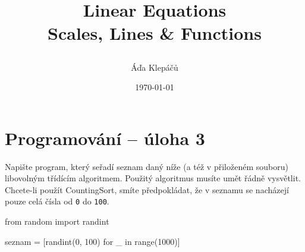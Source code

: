 \documentclass[a4paper,12pt]{article}
\title{\Huge\textsf{Linear Equations}\\
 \Large\textsf{Scales, Lines \& Functions}
 \author{Áďa Klepáčů}
 \date{\today}
}
\begin{document}
\thispagestyle{fancy}

\section*{Programování -- úloha 3}

Napište program, který seřadí seznam daný níže (a též v přiloženém souboru)
libovolným třídícím algoritmem. Použitý algoritmus musíte umět řádně vysvětlit.
Chcete-li použít CountingSort, smíte předpokládat, že v seznamu se nacházejí
pouze celá čísla od \texttt{0} do \texttt{100}.

\begin{center}
 \begin{python}
  from random import randint

  seznam = [randint(0, 100) for _ in range(1000)]
 \end{python}
\end{center}
\end{document}
